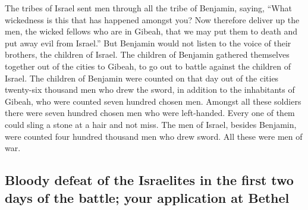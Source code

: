  The tribes of Israel sent men through all the tribe of
Benjamin, saying, ``What wickedness is this that has happened amongst
you?  Now therefore deliver up the men, the wicked
fellows who are in Gibeah, that we may put them to death and put away
evil from Israel.'' But Benjamin would not listen to the voice of their
brothers, the children of Israel.  The children of
Benjamin gathered themselves together out of the cities to Gibeah, to go
out to battle against the children of Israel.  The
children of Benjamin were counted on that day out of the cities
twenty-six thousand men who drew the sword, in addition to the
inhabitants of Gibeah, who were counted seven hundred chosen men.
 Amongst all these soldiers there were seven hundred
chosen men who were left-handed. Every one of them could sling a stone
at a hair and not miss.  The men of Israel, besides
Benjamin, were counted four hundred thousand men who drew sword. All
these were men of war.

\hypertarget{bloody-defeat-of-the-israelites-in-the-first-two-days-of-the-battle-your-application-at-bethel}{%
\subsection{Bloody defeat of the Israelites in the first two days of the
battle; your application at
Bethel}\label{bloody-defeat-of-the-israelites-in-the-first-two-days-of-the-battle-your-application-at-bethel}}

